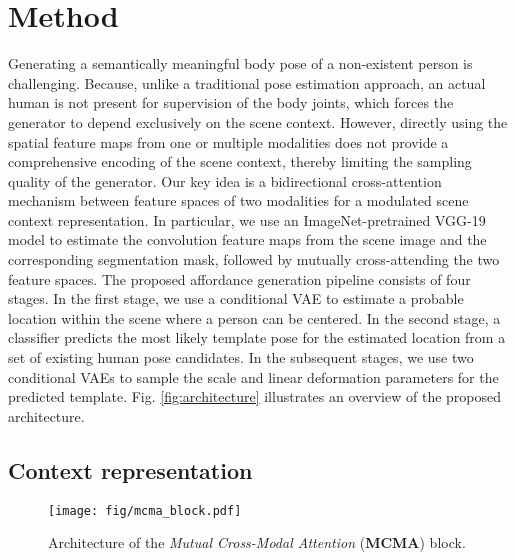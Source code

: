 \section{Method}
\label{sec:method}

Generating a semantically meaningful body pose of a non-existent person is challenging. Because, unlike a traditional pose estimation approach, an actual human is not present for supervision of the body joints, which forces the generator to depend exclusively on the scene context. However, directly using the spatial feature maps from one \cite{wang2017binge, do2018affordancenet, yao2023scene} or multiple \cite{chuang2018learning, wang2021scene, zhang2022inpaint} modalities does not provide a comprehensive encoding of the scene context, thereby limiting the sampling quality of the generator. Our key idea is a bidirectional cross-attention mechanism between feature spaces of two modalities for a modulated scene context representation. In particular, we use an ImageNet-pretrained \cite{deng2009imagenet} VGG-19 model \cite{simonyan2015very} to estimate the convolution feature maps from the scene image and the corresponding segmentation mask, followed by mutually cross-attending the two feature spaces. The proposed affordance generation pipeline consists of four stages. In the first stage, we use a conditional VAE to estimate a probable location within the scene where a person can be centered. In the second stage, a classifier predicts the most likely template pose for the estimated location from a set of existing human pose candidates. In the subsequent stages, we use two conditional VAEs to sample the scale and linear deformation parameters for the predicted template. Fig. \ref{fig:architecture} illustrates an overview of the proposed architecture.

\subsection{Context representation}
\label{sec:method_context}

\begin{figure}[t]
  \centering
  \texttt{[image: fig/mcma\_block.pdf]}
  \caption{Architecture of the \emph{Mutual Cross-Modal Attention} (\textbf{MCMA}) block.}
  \label{fig:mcma_block}
  \vspace{-1.0em}
\end{figure}

